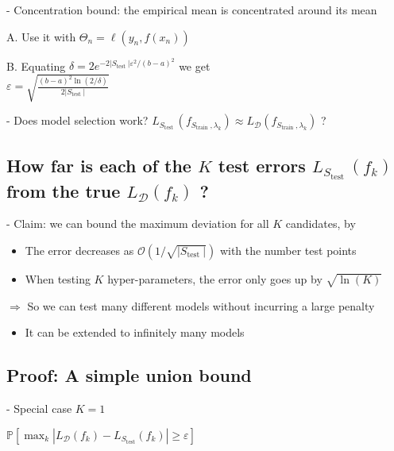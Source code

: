 - Concentration bound: the empirical mean is concentrated around its mean

A. Use it with $\Theta_{n}=\ell\left(y_{n}, f\left(x_{n}\right)\right)$

B. Equating $\delta=2 e^{-2\left|S_{\text {test }}\right| \varepsilon^{2} /(b-a)^{2}}$ we get \\$\varepsilon=\sqrt{\frac{(b-a)^{2} \ln (2 / \delta)}{2\left|S_{\text {test }}\right|}}$

- Does model selection work? $L_{S_{\text {test }}}\left(f_{S_{\text {train }}, \lambda_{k}}\right) \approx L_{\mathscr{D}}\left(f_{S_{\text {train }}, \lambda_{k}}\right)$ ?

\subsection*{How far is each of the $K$ test errors $L_{S_{\text {test }}}\left(f_{k}\right)$ from the true $L_{\mathscr{D}}\left(f_{k}\right)$ ?}
- Claim: we can bound the maximum deviation for all $K$ candidates, by


\begin{itemize}
  \item The error decreases as $\mathcal{O}\left(1 / \sqrt{\left|S_{\text {test }}\right|}\right)$ with the number test points
  \item When testing $K$ hyper-parameters, the error only goes up by $\sqrt{\ln (K)}$
\end{itemize}

$\Rightarrow$ So we can test many different models without incurring a large penalty

\begin{itemize}
  \item It can be extended to infinitely many models
\end{itemize}

\subsection*{Proof: A simple union bound}
- Special case $K=1$


$
\mathbb{P}[\max_{k}|L_{\mathscr{D}}(f_{k})-L_{S_{\text{test}}}(f_{k})| \geq \varepsilon]  
$

